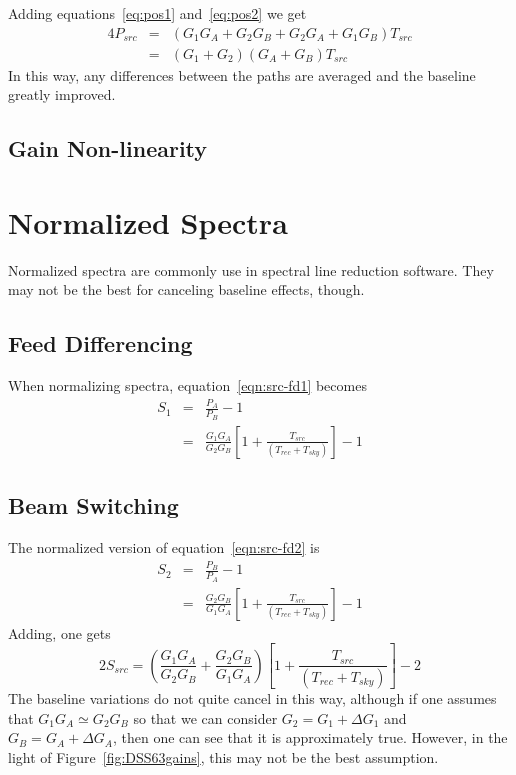 \documentclass[a4paper,11pt]{article}
\begin{document}
Adding equations~\ref{eq:pos1} and~\ref{eq:pos2} we get
\begin{eqnarray}
  4 P_{src} &=& (G_1 G_A + G_2 G_B + G_2 G_A + G_1 G_B) T_{src} \nonumber \\
            &=& (G_1 + G_2)(G_A + G_B) T_{src}
\end{eqnarray}
In this way, any differences between the paths are averaged and the baseline
greatly improved.

\subsection{Gain Non-linearity}



\section{Normalized Spectra}

Normalized spectra are commonly use in spectral line reduction software.  They
may not be the best for canceling baseline effects, though.

\subsection{Feed Differencing}

When normalizing spectra, equation~\ref{eqn:src-fd1} becomes
\begin{eqnarray*}
S_1  &=& \frac{P_A}{P_B} - 1 \\
     &=& \frac{G_1 G_A}{G_2 G_B}\left[1+\frac{T_{src}}{(T_{rec} + T_{sky})}\right] - 1
\end{eqnarray*}

\subsection{Beam Switching}

The normalized version of equation~\ref{eqn:src-fd2} is
\begin{eqnarray*}     
S_2  &=& \frac{P_B}{P_A} - 1 \\
     &=&\frac{G_2 G_B}{G_1 G_A}\left[1+\frac{T_{src}}{(T_{rec} + T_{sky})}\right] - 1
\end{eqnarray*}
Adding, one gets
\begin{equation}\label{eq:S1+S2}
2 S_{src} = \left( \frac{G_1 G_A}{G_2 G_B} + \frac{G_2 G_B}{G_1 G_A} \right)
          \left[1+\frac{T_{src}}{(T_{rec} + T_{sky})}\right] - 2
\end{equation}
The baseline variations do not quite cancel in this way, although if one
assumes that $G_1 G_A \simeq G_2 G_B$ so that we can consider 
$G_2 = G_1 + \Delta G_1$ and $G_B = G_A + \Delta G_A$, then one can see that it
is approximately true.  However, in the light of Figure~\ref{fig:DSS63gains},
this may not be the best assumption.
\end{document}
